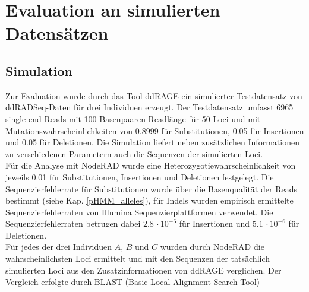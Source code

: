 \chapter{Evaluation an simulierten Datensätzen} \label{sec:}

\section{Simulation} \label{sec:sim}

Zur Evaluation wurde durch das Tool ddRAGE \cite{timm_2018, ddrage} ein simulierter Testdatensatz von ddRADSeq-Daten für drei Individuen erzeugt. Der Testdatensatz umfasst 6965 single-end Reads mit 100 Basenpaaren Readlänge für 50 Loci und mit Mutationswahrscheinlichkeiten von 0.8999 für Substitutionen, 0.05 für Insertionen und 0.05 für Deletionen. Die Simulation liefert neben zusätzlichen Informationen zu verschiedenen Parametern auch die Sequenzen der simulierten Loci. \\

Für die Analyse mit NodeRAD wurde eine Heterozygotiewahrscheinlichkeit von jeweils 0.01 für Substitutionen, Insertionen und Deletionen festgelegt. Die Sequenzierfehlerrate für Substitutionen wurde über die Basenqualität der Reads bestimmt (siehe Kap. \ref{pHMM_alleles}), für Indels wurden empirisch ermittelte Sequenzierfehlerraten von Illumina Sequenzierplattformen \cite{schirmer_2016} verwendet. Die Sequenzierfehlerraten betrugen dabei $ 2.8 \, \cdotp 10^{-6} $ für Insertionen und $ 5.1 \, \cdotp 10^{-6} $ für Deletionen. \\

Für jedes der drei Individuen $A$, $B$ und $C$ wurden durch NodeRAD die wahrscheinlichsten Loci ermittelt und mit den Sequenzen der tatsächlich simulierten Loci aus den Zusatzinformationen von ddRAGE verglichen. Der Vergleich erfolgte durch BLAST (Basic Local Alignment Search Tool) \cite{altschul_1990}



\subsection{} \label{subsec:}

